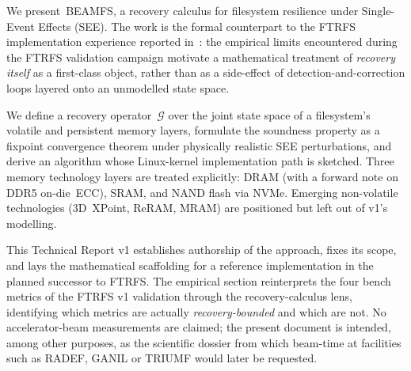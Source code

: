 We present~BEAMFS, a recovery calculus for filesystem resilience under
Single-Event Effects (SEE). The work is the formal counterpart to the
FTRFS implementation experience reported in~\cite{desbrieres2026ftrfs}:
the empirical limits encountered during the FTRFS validation campaign
motivate a mathematical treatment of \emph{recovery itself} as a
first-class object, rather than as a side-effect of detection-and-correction
loops layered onto an unmodelled state space.

We define a recovery operator~\(\mathcal{G}\) over the joint state space
of a filesystem's volatile and persistent memory layers, formulate the
soundness property as a fixpoint convergence theorem under physically
realistic SEE perturbations, and derive an algorithm whose Linux-kernel
implementation path is sketched. Three memory technology layers are
treated explicitly: \mbox{DRAM} (with a forward note on
\mbox{DDR5} on-die~\mbox{ECC}), \mbox{SRAM}, and \mbox{NAND} flash via
\mbox{NVMe}. Emerging non-volatile technologies (\mbox{3D~XPoint},
\mbox{ReRAM}, \mbox{MRAM}) are positioned but left out of v1's modelling.

This Technical Report v1 establishes authorship of the approach,
fixes its scope, and lays the mathematical scaffolding for a reference
implementation in the planned successor to FTRFS. The empirical
section reinterprets the four bench metrics of the FTRFS v1
validation through the recovery-calculus lens, identifying which
metrics are actually \emph{recovery-bounded} and which are not.
No accelerator-beam measurements are claimed; the present document
is intended, among other purposes, as the scientific dossier from
which beam-time at facilities such as RADEF, GANIL or TRIUMF would
later be requested.
